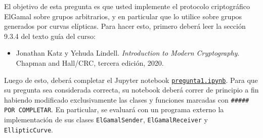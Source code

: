 
El objetivo de esta pregunta es que usted implemente el protocolo criptográfico ElGamal sobre grupos arbitrarios, y en particular que lo utilice sobre grupos generados por curvas elípticas. Para hacer esto, primero deberá leer la sección 9.3.4 del texto guía del curso:

\begin{itemize}
  \item Jonathan Katz y Yehuda Lindell. {\em Introduction to Modern Cryptography}. Chapman and Hall/CRC, tercera edición, 2020.
\end{itemize}

Luego de esto, deberá completar el Jupyter notebook \href{https://github.com/UC-IIC3253/2022/tree/main/Tareas/Tarea\%203/enunciado/pregunta1.ipynb}{\texttt{pregunta1.ipynb}}. Para que su pregunta sea considerada correcta, su notebook deberá correr de principio a fin habiendo modificado exclusivamente las clases y funciones marcadas con \texttt{\#\#\#\#\# POR COMPLETAR}. En particular, se evaluará con un programa externo la implementación de sus clases \texttt{ElGamalSender}, \texttt{ElGamalReceiver} y \texttt{EllipticCurve}.

